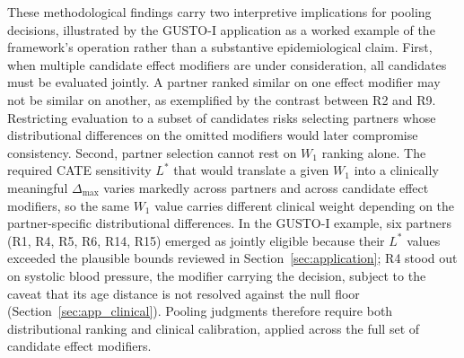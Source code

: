 \documentclass[AMA,Times1COL]{WileyNJDv5}
\begin{document}
These methodological findings carry two interpretive implications for pooling decisions, illustrated by the GUSTO-I application as a worked example of the framework's operation rather than a substantive epidemiological claim. First, when multiple candidate effect modifiers are under consideration, all candidates must be evaluated jointly. A partner ranked similar on one effect modifier may not be similar on another, as exemplified by the contrast between R2 and R9. Restricting evaluation to a subset of candidates risks selecting partners whose distributional differences on the omitted modifiers would later compromise consistency. Second, partner selection cannot rest on $W_1$ ranking alone. The required CATE sensitivity $L^*$ that would translate a given $W_1$ into a clinically meaningful $\Delta_{\max}$ varies markedly across partners and across candidate effect modifiers, so the same $W_1$ value carries different clinical weight depending on the partner-specific distributional differences. In the GUSTO-I example, six partners (R1, R4, R5, R6, R14, R15) emerged as jointly eligible because their $L^*$ values exceeded the plausible bounds reviewed in Section~\ref{sec:application}; R4 stood out on systolic blood pressure, the modifier carrying the decision, subject to the caveat that its age distance is not resolved against the null floor (Section~\ref{sec:app_clinical}). Pooling judgments therefore require both distributional ranking and clinical calibration, applied across the full set of candidate effect modifiers.
\end{document}
